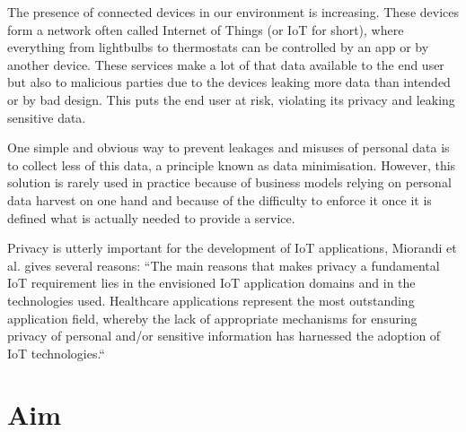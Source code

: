 

The presence of connected devices in our environment is increasing. These devices form a network often called Internet of Things (or IoT for short), where everything from lightbulbs to thermostats can be controlled by an app or by another device. These services make a lot of that data available to the end user but also to malicious parties due to the devices leaking more data than intended or by bad design. This puts the end user at risk, violating its privacy and leaking sensitive data. 

One simple and obvious way to prevent leakages and misuses of personal data is to collect less of this data, a principle known as data minimisation. However, this solution is rarely used in practice because of business models relying on personal data harvest on one hand and because of the difficulty to enforce it once it is defined what is actually needed to provide a service.

Privacy is utterly important for the development of IoT applications, Miorandi et al. gives several reasons\cite{miorandi2012internet}: “The main reasons that makes privacy a fundamental IoT requirement lies in the envisioned IoT application domains and in the technologies used. Healthcare applications represent the most outstanding application field, whereby the lack of appropriate mechanisms for ensuring privacy of personal and/or sensitive information has harnessed the adoption of IoT technologies.“ 




\section{Aim}



